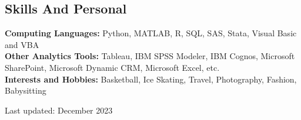 \documentclass[margin,line]{resume}
\begin{document}
\begin{resume}
    \section{\mysidestyle Skills And Personal}
    \textbf{Computing Languages:} Python, MATLAB, R, SQL, SAS, Stata, Visual Basic and VBA\\
    \textbf{Other Analytics Tools:} Tableau, IBM SPSS Modeler, IBM Cognos, Microsoft SharePoint, Microsoft Dynamic CRM, Microsoft Excel, etc.\\
    \textbf{Interests and Hobbies:} Basketball, Ice Skating, Travel, Photography, Fashion, Babysitting


%
%

\hfill 
\scriptsize Last updated: December 2023
\end{resume}   
\end{document}
